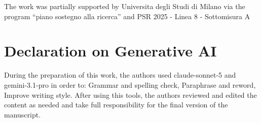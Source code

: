 \documentclass[
]{ceurart}
\begin{document}
\begin{acknowledgments}
  The work was partially supported by Universita degli Studi di Milano via the program “piano sostegno alla ricerca” and PSR 2025 - Linea 8 - Sottomisura A

\end{acknowledgments}

\section*{Declaration on Generative AI}

During the preparation of this work, the authors used claude-sonnet-5 and gemini-3.1-pro in order to: Grammar and spelling check, Paraphrase and reword, Improve writing style.
After using this tools, the authors reviewed and edited the content as needed and take full responsibility for the final version of the manuscript.



\end{document}
